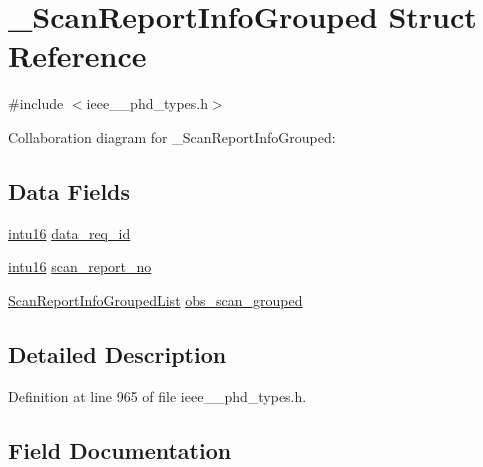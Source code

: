 \hypertarget{struct___scan_report_info_grouped}{}\section{\+\_\+\+Scan\+Report\+Info\+Grouped Struct Reference}
\label{struct___scan_report_info_grouped}


{\ttfamily \#include $<$ieee\+\_\+\_\+phd\+\_\+types.\+h$>$}



Collaboration diagram for \+\_\+\+Scan\+Report\+Info\+Grouped\+:
\subsection*{Data Fields}
\begin{DoxyCompactItemize}
\item 
\hyperlink{ieee__11073__phd__types_8h_a3561595d2aa7416532e1c9910abd076d}{intu16} \hyperlink{struct___scan_report_info_grouped_ad3e167bbeac9d4b94b67cb6966e1f1fb}{data\+\_\+req\+\_\+id}
\item 
\hyperlink{ieee__11073__phd__types_8h_a3561595d2aa7416532e1c9910abd076d}{intu16} \hyperlink{struct___scan_report_info_grouped_a21f75132869d4d200ffe01d91b4736d8}{scan\+\_\+report\+\_\+no}
\item 
\hyperlink{ieee__11073__phd__types_8h_a37e12e76e02f9a9af03017f3b5af3ea4}{Scan\+Report\+Info\+Grouped\+List} \hyperlink{struct___scan_report_info_grouped_abff484f3bf062c7efe1ee3ec4b46b2a8}{obs\+\_\+scan\+\_\+grouped}
\end{DoxyCompactItemize}


\subsection{Detailed Description}


Definition at line 965 of file ieee\+\_\+\_\+phd\+\_\+types.\+h.



\subsection{Field Documentation}
\hypertarget{struct___scan_report_info_grouped_ad3e167bbeac9d4b94b67cb6966e1f1fb}{}
